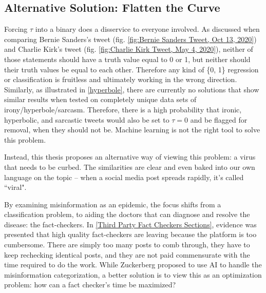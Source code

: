 \documentclass[preprint,review,12pt]{elsarticle}
\begin{document}
\subsection{Alternative Solution: Flatten the Curve}
\label{Flatten the Curve Section}
Forcing $\tau$ into a binary does a disservice to everyone involved. As discussed when comparing Bernie Sanders's tweet (fig. \ref{fig:Bernie Sanders Tweet, Oct 13, 2020}) and  Charlie Kirk's tweet (fig. \ref{fig:Charlie Kirk Tweet, May 4, 2020}), neither of those statements should have a truth value equal to 0 or 1, but neither should their truth values be equal to each other. Therefore any kind of \{0, 1\} regression or classification is fruitless and ultimately working in the wrong direction. Similarly, as illustrated in \ref{hyperbole}, there are currently no solutions that show similar results when tested on completely unique data sets of irony/hyperbole/sarcasm. Therefore, there is a high probability that ironic, hyperbolic, and sarcastic tweets would also be set to $\tau = 0$ and be flagged for removal, when they should not be. Machine learning is not the right tool to solve this problem. 
 
 Instead, this thesis proposes an alternative way of viewing this problem: a virus that needs to be curbed. The similarities are clear and even baked into our own language on the topic -- when a social media post spreads rapidly, it's called ``viral". 
 
 By examining misinformation as an epidemic, the focus shifts from a classification problem, to aiding the doctors that can diagnose and resolve the disease: the fact-checkers. In \ref{Third Party Fact Checkers Sections}, evidence was presented that high quality fact-checkers are leaving because the platform is too cumbersome. There are simply too many posts to comb through, they have to keep rechecking identical posts, and they are not paid commensurate with the time required to do the work. While Zuckerberg proposed to use AI to handle the misinformation categorization, a better solution is to view this as an optimization problem: how can a fact checker's time be maximized? 
 
\end{document}
